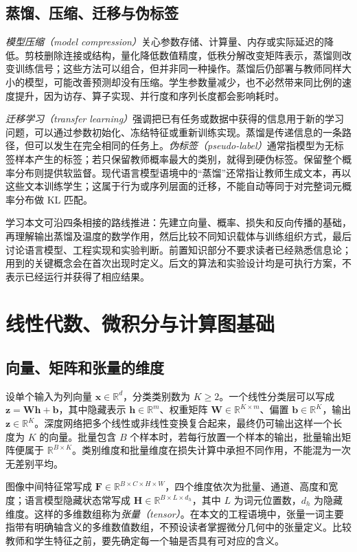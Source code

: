 \documentclass[UTF8,12pt,a4paper,fontset=fandol]{ctexart}
\begin{document}
\subsection{蒸馏、压缩、迁移与伪标签}
\emph{模型压缩（model compression）}关心参数存储、计算量、内存或实际延迟的降低。剪枝删除连接或结构，量化降低数值精度，低秩分解改变矩阵表示，蒸馏则改变训练信号；这些方法可以组合，但并非同一种操作。蒸馏后仍部署与教师同样大小的模型，可能改善预测却没有压缩。学生参数量减少，也不必然带来同比例的速度提升，因为访存、算子实现、并行度和序列长度都会影响耗时。

\emph{迁移学习（transfer learning）}强调把已有任务或数据中获得的信息用于新的学习问题，可以通过参数初始化、冻结特征或重新训练实现。蒸馏是传递信息的一条路径，但可以发生在完全相同的任务上。\emph{伪标签（pseudo-label）}通常指模型为无标签样本产生的标签；若只保留教师概率最大的类别，就得到硬伪标签。保留整个概率分布则提供软监督。现代语言模型语境中的“蒸馏”还常指让教师生成文本，再以这些文本训练学生；这属于行为或序列层面的迁移，不能自动等同于对完整词元概率分布做 KL 匹配。

学习本文可沿四条相接的路线推进：先建立向量、概率、损失和反向传播的基础，再理解输出蒸馏及温度的数学作用，然后比较不同知识载体与训练组织方式，最后讨论语言模型、工程实现和实验判断。前置知识部分不要求读者已经熟悉信息论；用到的关键概念会在首次出现时定义。后文的算法和实验设计均是可执行方案，不表示已经运行并获得了相应结果。

\section{线性代数、微积分与计算图基础}
\label{sec:kd-mathematics}

\subsection{向量、矩阵和张量的维度}
设单个输入为列向量 $\mathbf x\in\mathbb R^d$，分类类别数为 $K\geq2$。一个线性分类层可以写成 $\mathbf z=\mathbf W\mathbf h+\mathbf b$，其中隐藏表示 $\mathbf h\in\mathbb R^m$、权重矩阵 $\mathbf W\in\mathbb R^{K\times m}$、偏置 $\mathbf b\in\mathbb R^K$，输出 $\mathbf z\in\mathbb R^K$。深度网络把多个线性或非线性变换复合起来，最终仍可输出这样一个长度为 $K$ 的向量。批量包含 $B$ 个样本时，若每行放置一个样本的输出，批量输出矩阵便属于 $\mathbb R^{B\times K}$。类别维度和批量维度在损失计算中承担不同作用，不能混为一次无差别平均。

图像中间特征常写成 $\mathbf F\in\mathbb R^{B\times C\times H\times W}$，四个维度依次为批量、通道、高度和宽度；语言模型隐藏状态常写成 $\mathbf H\in\mathbb R^{B\times L\times d_h}$，其中 $L$ 为词元位置数，$d_h$ 为隐藏维度。这样的多维数组称为\emph{张量（tensor）}。在本文的工程语境中，张量一词主要指带有明确轴含义的多维数值数组，不预设读者掌握微分几何中的张量定义。比较教师和学生特征之前，要先确定每一个轴是否具有可对应的含义。
\end{document}
